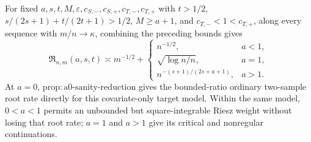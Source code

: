 For fixed \(a,s,t,M,\varepsilon,c_{S,-},c_{S,+},c_{T,-},c_{T,+}\) with \(t>1/2\), \(s/(2s+1)+t/(2t+1)>1/2\), \(M\ge a+1\), and \(c_{T,-}<1<c_{T,+}\), along every sequence with \(m/n\to\kappa\), combining the preceding bounds gives \[\mathfrak R_{n,m}(a,s,t)\asymp m^{-1/2}+\begin{cases}n^{-1/2},&a<1,\\ \sqrt{\log n/n},&a=1,\\ n^{-(s+1)/(2s+a+1)},&a>1.\end{cases}\] At \(a=0\), \(\mathrm{prop:a0\text{-}sanity\text{-}reduction}\) gives the bounded-ratio ordinary two-sample root rate directly for this covariate-only target model. Within the same model, \(0<a<1\) permits an unbounded but square-integrable Riesz weight without losing that root rate; \(a=1\) and \(a>1\) give its critical and nonregular continuations.